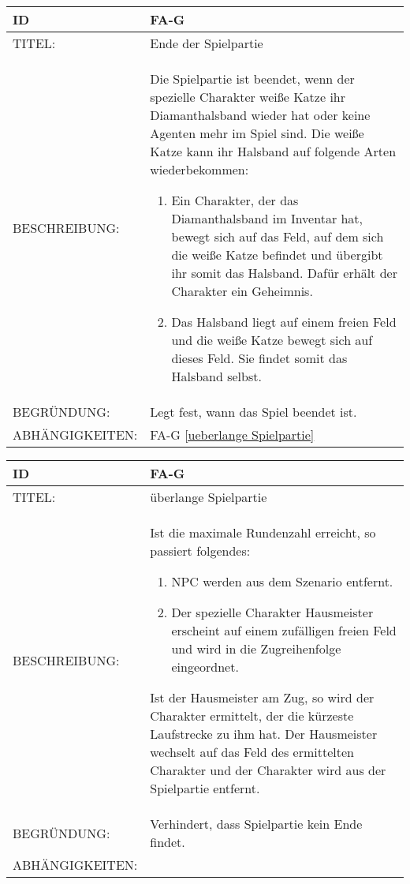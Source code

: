 \begin{tabularx}{16cm}{l|X}
	{table}\label{Ende der Spielpartie}
	\textbf{ID} & \textbf{FA-G \arabic{table}} \\
	\hline
	TITEL: & Ende der Spielpartie \\
	\hline
	BESCHREIBUNG: & Die Spielpartie ist beendet, wenn der spezielle Charakter weiße Katze ihr Diamanthalsband wieder hat oder keine Agenten mehr im Spiel sind. Die weiße Katze kann ihr Halsband auf folgende Arten wiederbekommen:
	\begin{enumerate}
		\item Ein Charakter, der das Diamanthalsband im Inventar hat, bewegt sich auf das Feld, auf dem sich die weiße Katze befindet und übergibt ihr somit das Halsband. Dafür erhält der Charakter ein Geheimnis.
		\item Das Halsband liegt auf einem freien Feld und die weiße Katze bewegt sich auf dieses Feld. Sie findet somit das Halsband selbst.
	\end{enumerate}\\
	\hline
	BEGRÜNDUNG: & Legt fest, wann das Spiel beendet ist. \\
	\hline
	ABHÄNGIGKEITEN: & FA-G \ref{ueberlange Spielpartie} \todo[inline]{Geheimnis} \\
\end{tabularx}

\begin{tabularx}{16cm}{l|X}
	{table}\label{ueberlange Spielpartie}
	\textbf{ID} & \textbf{FA-G \arabic{table}} \\
	\hline
	TITEL: & überlange Spielpartie \\
	\hline
	BESCHREIBUNG: & Ist die maximale Rundenzahl erreicht, so passiert folgendes:
	\begin{enumerate}
		\item NPC werden aus dem Szenario entfernt.
		\item Der spezielle Charakter Hausmeister erscheint auf einem zufälligen freien Feld und wird in die Zugreihenfolge eingeordnet.
	\end{enumerate}
	Ist der Hausmeister am Zug, so wird der Charakter ermittelt, der die kürzeste Laufstrecke zu ihm hat. Der Hausmeister wechselt auf das Feld des ermittelten Charakter und der Charakter wird aus der Spielpartie entfernt.\\
	\hline
	BEGRÜNDUNG: & Verhindert, dass Spielpartie kein Ende findet. \\
	\hline
	ABHÄNGIGKEITEN: &  \\
\end{tabularx}

